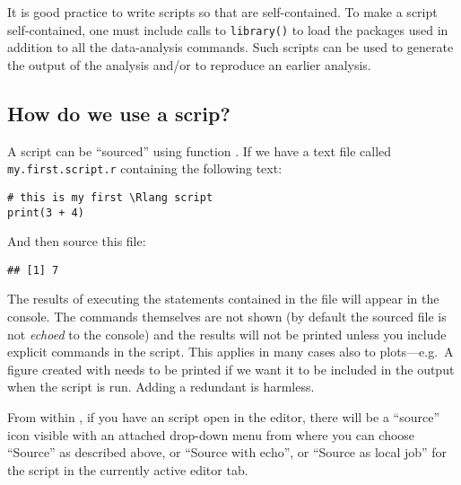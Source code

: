 \documentclass[krantz2]{krantz}\usepackage{knitr}%
\begin{document}
It is good practice to write scripts so that are self-contained. To make a script self-contained, one must include calls to \texttt{library()} to load the packages used in addition to all the data-analysis commands. Such scripts can be used to generate the output of the analysis and/or to reproduce an earlier analysis.



\subsection{How do we use a scrip?}\label{sec:script:using}

A script can be ``sourced'' using function . If we have a text file called \texttt{my.first.script.r} containing the following text:
\begin{shaded}
\footnotesize
\begin{verbatim}
# this is my first \Rlang script
print(3 + 4)
\end{verbatim}
\end{shaded}

And then source this file:

\begin{knitrout}\footnotesize
{}\color{fgcolor}\begin{kframe}
\begin{alltt}
\hlstd{(}\hlstd{)}
\end{alltt}
\begin{verbatim}
## [1] 7
\end{verbatim}
\end{kframe}
\end{knitrout}

The results of executing the statements contained in the file will appear in the console. The commands themselves are not shown (by default the sourced file is not \emph{echoed} to the console) and the results will not be printed unless you include explicit  commands in the script. This applies in many cases also to plots---e.g.\ A figure created with  needs to be printed if we want it to be included in the output when the script is run. Adding a redundant  is harmless.

From within \RStudio, if you have an \Rpgrm script open in the editor, there will be a ``source'' icon visible with an attached drop-down menu from where you can choose ``Source'' as described above, or ``Source with echo'', or ``Source as local job'' for the script in the currently active editor tab.
\end{document}
